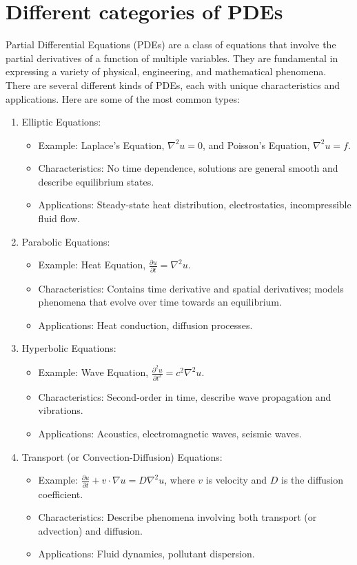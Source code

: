\documentclass[a4paper,12pt]{article} %
\begin{document}
\setlength{\parskip}{1em} 
\setlength{\parindent}{0pt}

\section{\textbf{Different categories of PDEs}}

Partial Differential Equations (PDEs) are a class of equations that involve the partial derivatives of a function of multiple variables. They are fundamental in expressing a variety of physical, engineering, and mathematical phenomena. There are several different kinds of PDEs, each with unique characteristics and applications. Here are some of the most common types:

\begin{enumerate}
\item Elliptic Equations:
\begin{itemize}
   \item Example: Laplace's Equation, \(\nabla^2 u = 0\), and Poisson's Equation, \(\nabla^2 u = f\).
   \item Characteristics: No time dependence, solutions are general 
   smooth and describe equilibrium states.
   \item Applications: Steady-state heat distribution, electrostatics, incompressible fluid flow.
\end{itemize}
\item Parabolic Equations:
\begin{itemize}
   \item Example: Heat Equation, \(\frac{\partial u}{\partial t} = \nabla^2 u\).
   \item Characteristics: Contains time derivative and spatial derivatives; models phenomena that evolve over time towards an equilibrium.
   \item Applications: Heat conduction, diffusion processes.
\end{itemize}
\item Hyperbolic Equations:
\begin{itemize}
   \item Example: Wave Equation, \(\frac{\partial^2 u}{\partial t^2} = c^2 \nabla^2 u\).
   \item Characteristics: Second-order in time, describe wave propagation and vibrations.
   \item Applications: Acoustics, electromagnetic waves, seismic waves.
\end{itemize}

\item Transport (or Convection-Diffusion) Equations:
\begin{itemize}
   \item Example: \(\frac{\partial u}{\partial t} + v \cdot \nabla u = D \nabla^2 u\), where \(v\) is velocity and \(D\) is the diffusion coefficient.
   \item Characteristics: Describe phenomena involving both transport (or advection) and diffusion.
   \item Applications: Fluid dynamics, pollutant dispersion.
\end{itemize}


\end{enumerate}
\end{document}
